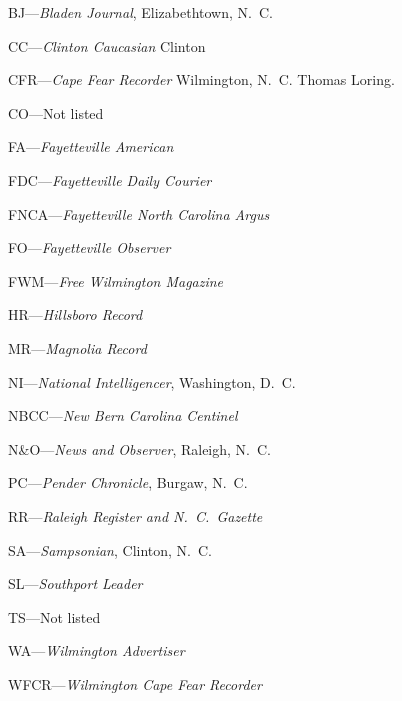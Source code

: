 \documentclass[11pt, a5paper, openright]{book}
\begin{document}
\begin{thebibliography}{99}
  BJ---\emph{Bladen Journal}, Elizabethtown, N.~C.

  CC---\emph{Clinton Caucasian} Clinton

  CFR---\emph{Cape Fear Recorder} Wilmington, N.~C.  Thomas Loring.

  CO---Not listed

  FA---\emph{Fayetteville American}

  FDC---\emph{Fayetteville Daily Courier}

  FNCA---\emph{Fayetteville North Carolina Argus}

  FO---\emph{Fayetteville Observer}

  FWM---\emph{Free Wilmington Magazine}

  HR---\emph{Hillsboro Record}

  MR---\emph{Magnolia Record}

  NI---\emph{National Intelligencer}, Washington, D.~C.

  NBCC---\emph{New Bern Carolina Centinel}

  N\&O---\emph{News and Observer}, Raleigh, N.~C.

  PC---\emph{Pender Chronicle}, Burgaw, N.~C.

  RR---\emph{Raleigh Register and N.~C.~Gazette}

  SA---\emph{Sampsonian}, Clinton, N.~C.

  SL---\emph{Southport Leader}

  TS---Not listed

  WA---\emph{Wilmington Advertiser}

  WFCR---\emph{Wilmington Cape Fear Recorder}


\end{thebibliography}
\end{document}

